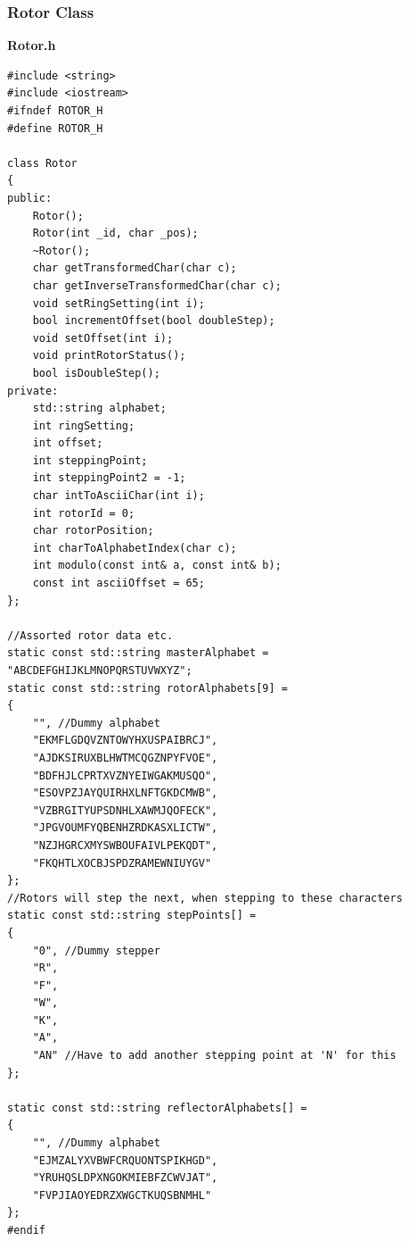 \documentclass{article}
\begin{document}
\subsubsection{Rotor Class}
\textbf{Rotor.h}
\begin{lstlisting}
#include <string>
#include <iostream>
#ifndef ROTOR_H
#define ROTOR_H

class Rotor
{
public:
	Rotor();
	Rotor(int _id, char _pos);
	~Rotor();
	char getTransformedChar(char c);
	char getInverseTransformedChar(char c);
	void setRingSetting(int i);
	bool incrementOffset(bool doubleStep);
	void setOffset(int i);
	void printRotorStatus();
	bool isDoubleStep();
private:
	std::string alphabet;
	int ringSetting;
	int offset;
	int steppingPoint;
	int steppingPoint2 = -1;
	char intToAsciiChar(int i);
	int rotorId = 0;
	char rotorPosition;
	int charToAlphabetIndex(char c);
	int modulo(const int& a, const int& b);
	const int asciiOffset = 65;
};

//Assorted rotor data etc. 
static const std::string masterAlphabet = "ABCDEFGHIJKLMNOPQRSTUVWXYZ";
static const std::string rotorAlphabets[9] = 
{
	"", //Dummy alphabet
	"EKMFLGDQVZNTOWYHXUSPAIBRCJ",
	"AJDKSIRUXBLHWTMCQGZNPYFVOE",
	"BDFHJLCPRTXVZNYEIWGAKMUSQO",
	"ESOVPZJAYQUIRHXLNFTGKDCMWB",
	"VZBRGITYUPSDNHLXAWMJQOFECK",
	"JPGVOUMFYQBENHZRDKASXLICTW",
	"NZJHGRCXMYSWBOUFAIVLPEKQDT",
	"FKQHTLXOCBJSPDZRAMEWNIUYGV"
};
//Rotors will step the next, when stepping to these characters
static const std::string stepPoints[] = 
{
	"0", //Dummy stepper
	"R",
	"F",
	"W",
	"K",
	"A",
	"AN" //Have to add another stepping point at 'N' for this
};

static const std::string reflectorAlphabets[] = 
{
	"", //Dummy alphabet
	"EJMZALYXVBWFCRQUONTSPIKHGD",
	"YRUHQSLDPXNGOKMIEBFZCWVJAT",
	"FVPJIAOYEDRZXWGCTKUQSBNMHL"
};
#endif
\end{lstlisting}
\end{document}

